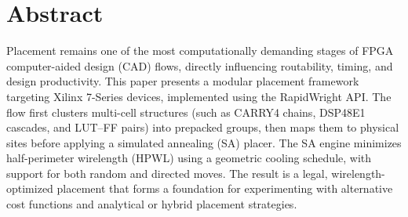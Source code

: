 \section{Abstract}
Placement remains one of the most computationally demanding stages of FPGA computer-aided design (CAD) flows, directly influencing routability, timing, and design productivity. 
This paper presents a modular placement framework targeting Xilinx 7-Series devices, implemented using the RapidWright API. 
The flow first clusters multi-cell structures (such as CARRY4 chains, DSP48E1 cascades, and LUT–FF pairs) into prepacked groups, then maps them to physical sites before applying a simulated annealing (SA) placer. 
The SA engine minimizes half-perimeter wirelength (HPWL) using a geometric cooling schedule, with support for both random and directed moves. 
The result is a legal, wirelength-optimized placement that forms a foundation for experimenting with alternative cost functions and analytical or hybrid placement strategies.

